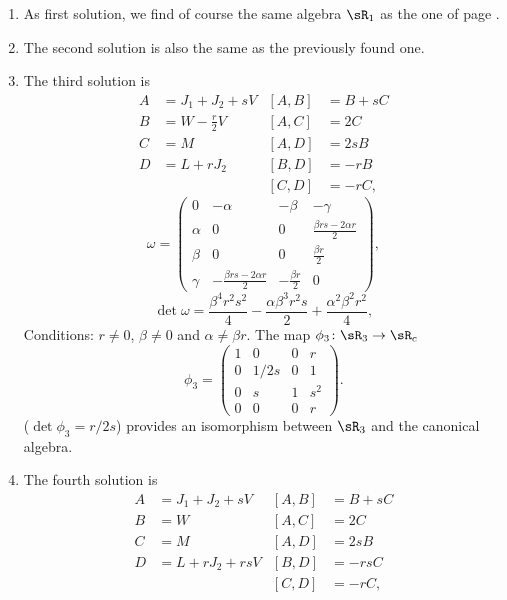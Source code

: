 \let\ANCtheenumi\theenumi
 \renewcommand{\theenumi}{\arabic{enumi}.} 
\begin{enumerate} 
\item As first solution, we find of course the same algebra $\sR_1$ as the one of page \pageref{PgAlgUn}.
\item The second solution is also the same as the previously found one.
\item The third solution is
\begin{align*}
A&=J_{1}+J_{2}+sV       &[A,B]&=B+sC\\
B&=W-\frac{ r }{2}V     &[A,C]&=2C\\
C&=M                &[A,D]&=2sB\\
D&=L+rJ_{2}         &[B,D]&=-rB\\
 &              &[C,D]&=-rC,
\end{align*}
\begin{equation}
\omega=\begin{pmatrix}
0   &-\alpha        &-\beta &-\gamma\\
\alpha  &0          &0  &\frac{ \beta rs-2\alpha r  }{ 2 }\\
\beta   &0          &0  &\frac{ \beta r }{2}\\
\gamma  &-\frac{ \beta rs-2\alpha r  }{ 2 } &-\frac{ \beta r }{2}   &0
\end{pmatrix},
\end{equation}
\[
  \det\omega=\frac{ \beta^{4}r^{2}s^{2} }{ 4 }-\frac{ \alpha\beta^{3}r^{2}s }{ 2 }+\frac{ \alpha^{2}\beta^{2}r^{2} }{ 4 },
\]
Conditions: $r\neq 0$, $\beta\neq 0$ and $\alpha\neq\beta r$. The map $\phi_3\colon \sR_3\to \sR_c$
\[ 
  \phi_3=
\begin{pmatrix}
1   &   0   &   0   &   r\\
0   &   1/2s    &   0   &   1\\
0   &   s   &   1   &   s^2\\
0   &   0   &   0   &   r
\end{pmatrix}.
\]
($\det\phi_3=r/2s$) provides an isomorphism between $\sR_3$ and the canonical algebra.
\item The fourth solution is
\begin{align*}
A&=J_{1}+J_{2}+sV       &[A,B]&=B+sC\\
B&=W                &[A,C]&=2C\\
C&=M                &[A,D]&=2sB\\
D&=L+rJ_{2}+rsV         &[B,D]&=-rsC\\
 &              &[C,D]&=-rC,

\end{align*}
\end{enumerate}
